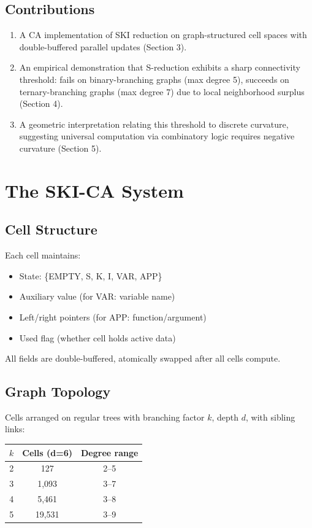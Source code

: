 \documentclass[11pt]{article}
\begin{document}
\subsection{Contributions}
\begin{enumerate}
\item A CA implementation of SKI reduction on graph-structured cell spaces with double-buffered parallel updates (Section 3).
\item An empirical demonstration that S-reduction exhibits a sharp connectivity threshold: fails on binary-branching graphs (max degree 5), succeeds on ternary-branching graphs (max degree 7) due to local neighborhood surplus (Section 4).
\item A geometric interpretation relating this threshold to discrete curvature, suggesting universal computation via combinatory logic requires negative curvature (Section 5).
\end{enumerate}

\section{The SKI-CA System}

\subsection{Cell Structure}

Each cell maintains:
\begin{itemize}
\item State: \{EMPTY, S, K, I, VAR, APP\}
\item Auxiliary value (for VAR: variable name)
\item Left/right pointers (for APP: function/argument)
\item Used flag (whether cell holds active data)
\end{itemize}

All fields are double-buffered, atomically swapped after all cells compute.

\subsection{Graph Topology}

Cells arranged on regular trees with branching factor $k$, depth $d$, with sibling links:

\begin{center}
\begin{tabular}{ccc}
\toprule
$k$ & Cells (d=6) & Degree range \\
\midrule
2 & 127 & 2--5 \\
3 & 1,093 & 3--7 \\
4 & 5,461 & 3--8 \\
5 & 19,531 & 3--9 \\
\bottomrule
\end{tabular}
\end{center}
\end{document}
